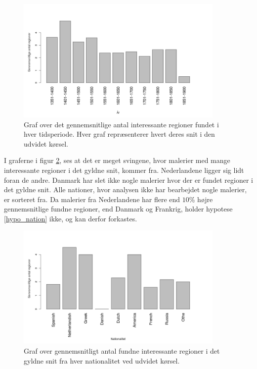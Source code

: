{\begin{figure}[!h]
	\begin{center}
		\includegraphics[angle=0,width=0.90\textwidth]{afsnit/resultater/billeder/yearcutU.png}
	\end{center}
    \caption{Graf over det gennemsnitlige antal interessante regioner
    fundet i hver tidsperiode. Hver graf repræsenterer hvert deres snit
    i den udvidet kørsel.}
	\label{udvidet_year}
\end{figure}

I graferne i figur \ref{udvidet_nation}, ses at det er meget svingene,
hvor malerier med mange interessante regioner i det gyldne snit, kommer
fra. Nederlandene ligger sig lidt foran de andre. Danmark har slet ikke
nogle malerier hvor der er fundet regioner i det gyldne snit. Alle
nationer, hvor analysen ikke har bearbejdet nogle malerier, er sorteret
fra. Da malerier fra Nederlandene har flere end $10\%$ højre
gennemsnitlige fundne regioner, end Danmark og Frankrig, holder hypotese
\ref{hypo_nation} ikke, og kan derfor forkastes.

\begin{figure}[!h]
	\begin{center}
		\includegraphics[angle=0,width=0.90\textwidth]{afsnit/resultater/billeder/nationcutU.png}
	\end{center}
    \caption{Graf over gennemsnitligt antal fundne interessante regioner
    i det gyldne snit fra hver nationalitet ved udvidet kørsel.}
	\label{udvidet_nation}
\end{figure}

}
